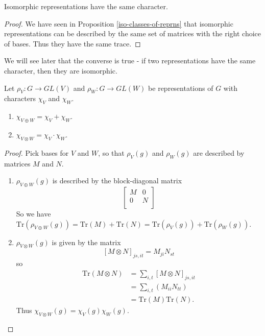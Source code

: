 \begin{prop}\label{iso-reprns-same-char}
Isomorphic representations have the same character.
\end{prop}
\begin{proof}
We have seen in Proposition \ref{iso-classes-of-reprns} that isomorphic representations can be described by the same set of matrices with the right choice of bases.  Thus they have the same trace.
\end{proof}
We will see later that the converse is true - if two representations have the same character, then they are isomorphic.

\begin{prop}
Let $\rho_V \colon G \to GL(V)$ and $\rho_W \colon G \to GL(W)$ be representations of $G$ with characters $\chi_V$ and $\chi_W$.
\begin{enumerate}
\item $\chi _{V \oplus W} = \chi_V + \chi_W$.
\item $\chi_{V \otimes W} = \chi_V \cdot \chi_W$.
\end{enumerate}
\end{prop}
\begin{proof}
Pick bases for $V$ and $W$, so that $\rho_V (g)$ and $\rho_W (g)$ are described by matrices $M$ and $N$.  
\begin{enumerate}
\item $\rho_{V \oplus W} (g)$ is described by the block-diagonal matrix
\[ \begin{bmatrix}
M & 0 \\
0 & N \\
\end{bmatrix}\]
So we have $\text{Tr} (\rho_{V \oplus W} (g)) = \text{Tr} (M) + \text{Tr}(N) = \text{Tr}(\rho_V (g)) + \text{Tr} (\rho_W (g))$.

\item $\rho_ {V \otimes W}(g)$ is given by the matrix
\[ [M \otimes N ]_{js, it} = M_{ji} N_{st} \]
so
\begin{align*}
\text{Tr} (M \otimes N) &= \sum_{i,t} [M \otimes N]_{js,it} \\
	&= \sum_{i,t} (M_{ii} N_{tt}) \\
	&= \text{Tr} (M) \text{Tr} (N).
\end{align*}
Thus $\chi_{V \otimes W} (g)= \chi_V (g) \chi_W(g)$.
\end{enumerate}
\end{proof}

